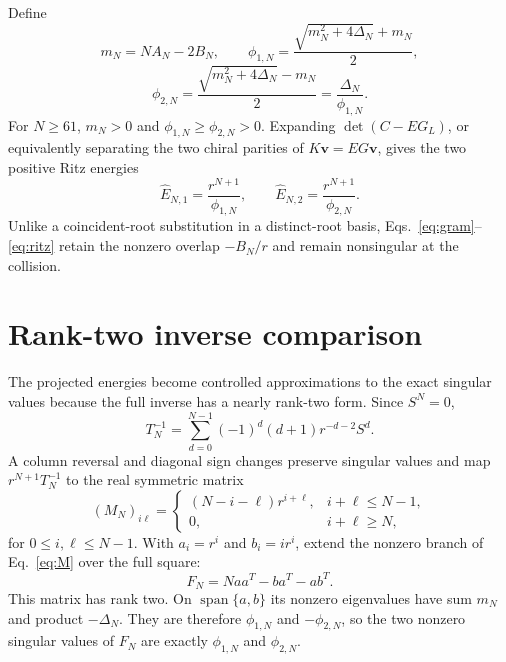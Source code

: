\documentclass[aps,prb,reprint,superscriptaddress,longbibliography]{revtex4-2}
\begin{document}
Define
\begin{equation}
 m_N=NA_N-2B_N,\qquad
 \phi_{1,N}=\frac{\sqrt{m_N^2+4\Delta_N}+m_N}{2},
 \label{eq:phi1}
\end{equation}
\begin{equation}
 \phi_{2,N}=\frac{\sqrt{m_N^2+4\Delta_N}-m_N}{2}
 =\frac{\Delta_N}{\phi_{1,N}}.
 \label{eq:phi2}
\end{equation}
For $N\geq61$, $m_N>0$ and
$\phi_{1,N}\geq\phi_{2,N}>0$.  Expanding
$\det(C-EG_L)$, or equivalently separating the two chiral parities of
$K\bm v=EG\bm v$, gives the two positive Ritz energies
\begin{equation}
 \boxed{
 \widehat E_{N,1}=\frac{r^{N+1}}{\phi_{1,N}},\qquad
 \widehat E_{N,2}=\frac{r^{N+1}}{\phi_{2,N}}.}
 \label{eq:ritz}
\end{equation}
Unlike a coincident-root substitution in a distinct-root basis,
Eqs.~\eqref{eq:gram}--\eqref{eq:ritz} retain the nonzero overlap $-B_N/r$
and remain nonsingular at the collision.

\section{Rank-two inverse comparison}
\label{sec:inverse}

The projected energies become controlled approximations to the exact
singular values because the full inverse has a nearly rank-two form.  Since
$S^N=0$,
\begin{equation}
 T_N^{-1}=\sum_{d=0}^{N-1}(-1)^d(d+1)r^{-d-2}S^d.
 \label{eq:inverse}
\end{equation}
A column reversal and diagonal sign changes preserve singular values and
map $r^{N+1}T_N^{-1}$ to the real symmetric matrix
\begin{equation}
 (M_N)_{i\ell}=
 \begin{cases}
 (N-i-\ell)r^{i+\ell},&i+\ell\leq N-1,\\
 0,&i+\ell\geq N,
 \end{cases}
 \label{eq:M}
\end{equation}
for $0\leq i,\ell\leq N-1$.  With $a_i=r^i$ and $b_i=ir^i$, extend the
nonzero branch of Eq.~\eqref{eq:M} over the full square:
\begin{equation}
 F_N=Naa^T-ba^T-ab^T.
 \label{eq:F}
\end{equation}
This matrix has rank two.  On $\operatorname{span}\{a,b\}$ its nonzero
eigenvalues have sum $m_N$ and product $-\Delta_N$.  They are therefore
$\phi_{1,N}$ and $-\phi_{2,N}$, so the two nonzero singular values of $F_N$
are exactly $\phi_{1,N}$ and $\phi_{2,N}$.
\end{document}
